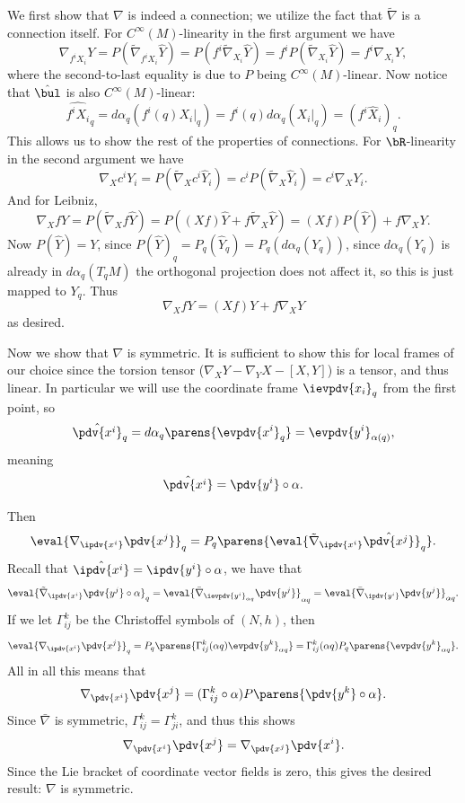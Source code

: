     We first show that $\nabla$ is indeed a connection; we utilize the fact that $\tilde\nabla$ is a connection itself.
    For $C^\infty(M)$-linearity in the first argument we have
    $$ \nabla_{f^iX_i}Y = P(\tilde\nabla_{f^iX_i}\hat Y) = P(f^i\tilde\nabla_{X_i}\hat Y) = f^iP(\tilde\nabla_{X_i}\hat Y)
    = f^i\nabla_{X_i}Y , $$
    where the second-to-last equality is due to $P$ being $C^\infty(M)$-linear.
    Now notice that $\hat\bul$ is also $C^\infty(M)$-linear:
    $$ \hat{f^iX_i}_q = d\alpha_q(f^i(q)X_i|_q) = f^i(q)d\alpha_q(X_i|_q) = (f^i\hat X_i)_q . $$
    This allows us to show the rest of the properties of connections.
    For $\bR$-linearity in the second argument we have
    $$ \nabla_Xc^iY_i = P(\tilde\nabla_Xc^i\hat Y_i) = c^iP(\tilde\nabla_X\hat Y_i) = c^i\nabla_XY_i . $$
    And for Leibniz,
    $$ \nabla_XfY = P(\tilde\nabla_Xf\hat Y) = P((Xf)\hat Y + f\tilde\nabla_X\hat Y) = (Xf)P(\hat Y) + f\nabla_XY . $$
    Now $P(\hat Y)=Y$, since $P(\hat Y)_q=P_q(\hat Y_q)=P_q(d\alpha_q(Y_q))$, since $d\alpha_q(Y_q)$ is already in
    $d\alpha_q(T_qM)$ the orthogonal projection does not affect it, so this is just mapped to $Y_q$.
    Thus
    $$ \nabla_XfY = (Xf)Y + f\nabla_XY $$
    as desired.

    Now we show that $\nabla$ is symmetric.
    It is sufficient to show this for local frames of our choice since the torsion tensor ($\nabla_XY-\nabla_YX-[X,Y]$)
    is a tensor, and thus linear.
    In particular we will use the coordinate frame $\ievpdv{x_i}_q$ from the first point, so
    $$ \hat{\pdv{x^i}}_q  = d\alpha_q\parens{\evpdv{x^i}_q} = \evpdv{y^i}_{\alpha(q)}, $$
    meaning
    $$ \hat{\pdv{x^i}} = \pdv{y^i}\circ\alpha . $$

    Then
    $$ \eval{\nabla_{\ipdv{x^i}}\pdv{x^j}}_q = P_q\parens{\eval{\tilde\nabla_{\ipdv{x^i}}\hat{\pdv{x^j}}}_q} . $$
    Recall that $\hat{\ipdv{x^i}}=\ipdv{y^i}\circ\alpha$, we have that
    $$ \eval{\tilde\nabla_{\ipdv{x^i}}\pdv{y^j}\circ\alpha}_q =
    \eval{\bar\nabla_{\ievpdv{y^i}_{\alpha q}}\pdv{y^j}}_{\alpha q} = \eval{\bar\nabla_{\ipdv{y^i}}\pdv{y^j}}_{\alpha q} . $$
    If we let $\Gamma^k_{ij}$ be the Christoffel symbols of $(N,h)$, then
    $$ \eval{\nabla_{\ipdv{x^i}}\pdv{x^j}}_q = P_q\parens{\Gamma^k_{ij}(\alpha q)\evpdv{y^k}_{\alpha q}}
    = \Gamma^k_{ij}(\alpha q)P_q\parens{\evpdv{y^k}_{\alpha q}} . $$
    All in all this means that
    $$ \nabla_{\pdv{x^i}}\pdv{x^j} = (\Gamma^k_{ij}\circ\alpha)P\parens{\pdv{y^k}\circ\alpha} . $$
    Since $\bar\nabla$ is symmetric, $\Gamma^k_{ij}=\Gamma^k_{ji}$, and thus this shows
    $$ \nabla_{\pdv{x^i}}\pdv{x^j} = \nabla_{\pdv{x^j}}\pdv{x^i} . $$
    Since the Lie bracket of coordinate vector fields is zero, this gives the desired result: $\nabla$ is symmetric.

